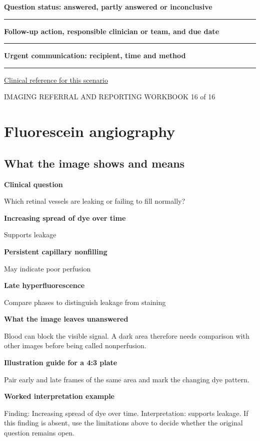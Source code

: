 \documentclass[11pt,a4paper]{article}
\newcommand{\record}[1]{\textbf{#1}\par\vspace{0.55\baselineskip}\hrule\vspace{0.35\baselineskip}}
\begin{document}
\record{Question status: answered, partly answered or inconclusive}

\record{Follow-up action, responsible clinician or team, and due date}

\record{Urgent communication: recipient, time and method}

\small\href{https://www.aaojournal.org/article/S0161-6420(19)32902-5/fulltext/}{Clinical reference for this scenario}

\normalsize

\newpage

{\small IMAGING REFERRAL AND REPORTING WORKBOOK \hfill 16 of 16}

\section*{Fluorescein angiography}

\subsection*{What the image shows and means}

\textbf{Clinical question}\par Which retinal vessels are leaking or failing to fill normally?\par

\textbf{Increasing spread of dye over time}\par Supports leakage\par

\textbf{Persistent capillary nonfilling}\par May indicate poor perfusion\par

\textbf{Late hyperfluorescence}\par Compare phases to distinguish leakage from staining\par

\textbf{What the image leaves unanswered}\par Blood can block the visible signal. A dark area therefore needs comparison with other images before being called nonperfusion.\par

\textbf{Illustration guide for a 4:3 plate}\par Pair early and late frames of the same area and mark the changing dye pattern.\par

\textbf{Worked interpretation example}\par Finding: Increasing spread of dye over time. Interpretation: supports leakage. If this finding is absent, use the limitations above to decide whether the original question remains open.\par
\end{document}
